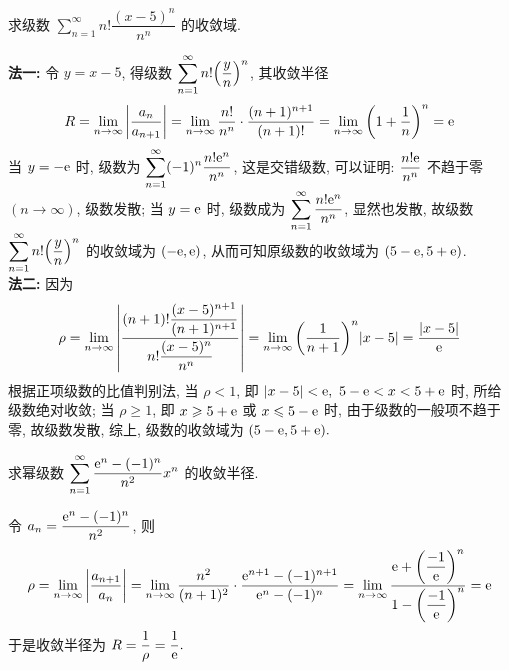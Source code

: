 \begin{example}
    求级数 $\displaystyle\sum_{n=1}^{\infty}n!\dfrac{(x-5)^n}{n^n}$ 的收敛域.
\end{example}
\begin{solution}
    \textbf{法一: }令 $y=x-5$, 得级数 $\displaystyle\sum_{n=1}^{\infty}n!\qty(\dfrac{y}{n})^n$, 其收敛半径
    $$R=\lim_{n\to\infty}\qty|\dfrac{a_n}{a_{n+1}}|=\lim_{n\to\infty}\dfrac{n!}{n^n}\cdot\dfrac{(n+1)^{n+1}}{(n+1)!}=\lim_{n\to\infty}\qty(1+\dfrac{1}{n})^n=\mathrm{e}$$
    当 $y=-\mathrm{e}$ 时, 级数为 $\displaystyle\sum_{n=1}^{\infty}(-1)^n\dfrac{n!\mathrm{e}^n}{n^n}$, 这是交错级数, 可以证明: $\dfrac{n!\mathrm{e}}{n^n}$ 不趋于零 $(n\to\infty)$, 级数发散;
    当 $y=\mathrm{e}$ 时, 级数成为 $\displaystyle\sum_{n=1}^{\infty}\dfrac{n!\mathrm{e}^n}{n^n}$, 显然也发散, 故级数 $\displaystyle\sum_{n=1}^{\infty}n!\qty(\dfrac{y}{n})^n$ 的收敛域为 $(-\mathrm{e},\mathrm{e})$, 
    从而可知原级数的收敛域为 $(5-\mathrm{e} ,5+\mathrm{e})$.\\
    \textbf{法二: }因为 $$\rho=\lim_{n\to\infty}\qty|\dfrac{(n+1)!\dfrac{(x-5)^{n+1}}{(n+1)^{n+1}}}{n!\dfrac{(x-5)^n}{n^n}}|=\lim_{n\to\infty}\qty(\dfrac{1}{n+1})^n|x-5|=\dfrac{|x-5|}{\mathrm{e}}$$
    根据正项级数的比值判别法, 当 $\rho<1$, 即 $|x-5|<\mathrm{e},~5-\mathrm{e}<x<5+\mathrm{e}$ 时, 所给级数绝对收敛;
    当 $\rho\geqslant 1$, 即 $x\geqslant 5+\mathrm{e}$ 或 $x\leqslant 5-\mathrm{e}$ 时, 由于级数的一般项不趋于零, 故级数发散, 综上, 级数的收敛域为 $(5-\mathrm{e},5+\mathrm{e}).$
\end{solution}


\begin{example}[2009 数三]
    求幂级数 $\displaystyle\sum_{n=1}^{\infty}\dfrac{\mathrm{e}^n-(-1)^n}{n^2}x^n$ 的收敛半径.
\end{example}
\begin{solution}
    令 $a_n=\dfrac{\mathrm{e}^n-(-1)^n}{n^2}$, 则
    $$\rho=\lim_{n\to\infty}\qty|\dfrac{a_{n+1}}{a_n}|=\lim_{n\to\infty}\dfrac{n^2}{(n+1)^2}\cdot\dfrac{\mathrm{e}^{n+1}-(-1)^{n+1}}{\mathrm{e}^{n}-(-1)^n}=\lim_{n\to\infty}\dfrac{\mathrm{e}+\qty(\dfrac{-1}{\mathrm{e}})^n}{1-\qty(\dfrac{-1}{\mathrm{e}})^n}=\mathrm{e}$$
    于是收敛半径为 $R=\dfrac{1}{\rho}=\dfrac{1}{\mathrm{e}}.$
\end{solution}

